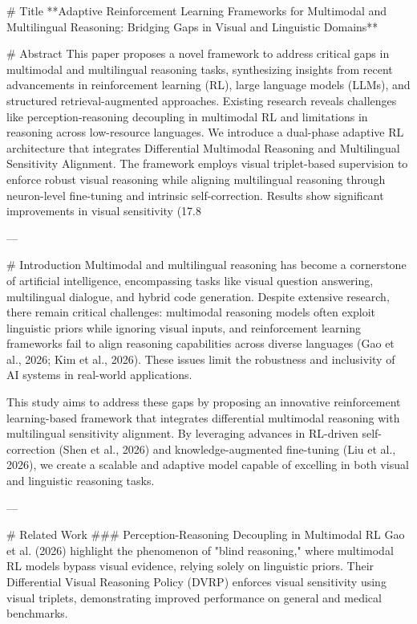 # Title  
**Adaptive Reinforcement Learning Frameworks for Multimodal and Multilingual Reasoning: Bridging Gaps in Visual and Linguistic Domains**

# Abstract  
This paper proposes a novel framework to address critical gaps in multimodal and multilingual reasoning tasks, synthesizing insights from recent advancements in reinforcement learning (RL), large language models (LLMs), and structured retrieval-augmented approaches. Existing research reveals challenges like perception-reasoning decoupling in multimodal RL and limitations in reasoning across low-resource languages. We introduce a dual-phase adaptive RL architecture that integrates Differential Multimodal Reasoning and Multilingual Sensitivity Alignment. The framework employs visual triplet-based supervision to enforce robust visual reasoning while aligning multilingual reasoning through neuron-level fine-tuning and intrinsic self-correction. Results show significant improvements in visual sensitivity (17.8%

---

# Introduction  
Multimodal and multilingual reasoning has become a cornerstone of artificial intelligence, encompassing tasks like visual question answering, multilingual dialogue, and hybrid code generation. Despite extensive research, there remain critical challenges: multimodal reasoning models often exploit linguistic priors while ignoring visual inputs, and reinforcement learning frameworks fail to align reasoning capabilities across diverse languages (Gao et al., 2026; Kim et al., 2026). These issues limit the robustness and inclusivity of AI systems in real-world applications.

This study aims to address these gaps by proposing an innovative reinforcement learning-based framework that integrates differential multimodal reasoning with multilingual sensitivity alignment. By leveraging advances in RL-driven self-correction (Shen et al., 2026) and knowledge-augmented fine-tuning (Liu et al., 2026), we create a scalable and adaptive model capable of excelling in both visual and linguistic reasoning tasks.

---

# Related Work  
### Perception-Reasoning Decoupling in Multimodal RL  
Gao et al. (2026) highlight the phenomenon of "blind reasoning," where multimodal RL models bypass visual evidence, relying solely on linguistic priors. Their Differential Visual Reasoning Policy (DVRP) enforces visual sensitivity using visual triplets, demonstrating improved performance on general and medical benchmarks.

